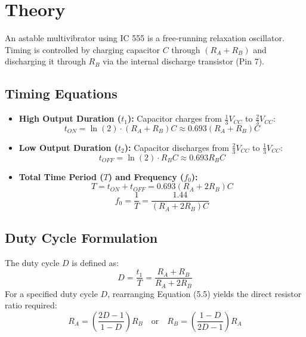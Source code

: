 \section{Theory}
An astable multivibrator using IC 555 is a free-running relaxation oscillator. Timing is controlled by charging capacitor $C$ through $(R_A + R_B)$ and discharging it through $R_B$ via the internal discharge transistor (Pin 7).

\subsection{Timing Equations}
\begin{itemize}
	\item \textbf{High Output Duration ($t_1$):} Capacitor charges from $\frac{1}{3} V_{CC}$ to $\frac{2}{3} V_{CC}$:
	\begin{equation}
		t_{ON} = \ln(2) \cdot (R_A + R_B) C \approx 0.693 (R_A + R_B) C
	\end{equation}
	
	\item \textbf{Low Output Duration ($t_2$):} Capacitor discharges from $\frac{2}{3} V_{CC}$ to $\frac{1}{3} V_{CC}$:
	\begin{equation}
		t_{OFF} = \ln(2) \cdot R_B C \approx 0.693 R_B C
	\end{equation}
	
	\item \textbf{Total Time Period ($T$) and Frequency ($f_0$):}
	\begin{equation}
		T = t_{ON} + t_{OFF} = 0.693 (R_A + 2 R_B) C
	\end{equation}
	\begin{equation}
		f_0 = \frac{1}{T} = \frac{1.44}{(R_A + 2 R_B) C}
	\end{equation}
\end{itemize}

\subsection{Duty Cycle Formulation}
The duty cycle $D$ is defined as:
\begin{equation}
	D = \frac{t_1}{T} = \frac{R_A + R_B}{R_A + 2 R_B}
\end{equation}
For a specified duty cycle $D$, rearranging Equation (5.5) yields the direct resistor ratio required:
\begin{equation}
	R_A = \left( \frac{2D - 1}{1 - D} \right) R_B \quad \text{or} \quad R_B = \left( \frac{1 - D}{2D - 1} \right) R_A
\end{equation}

